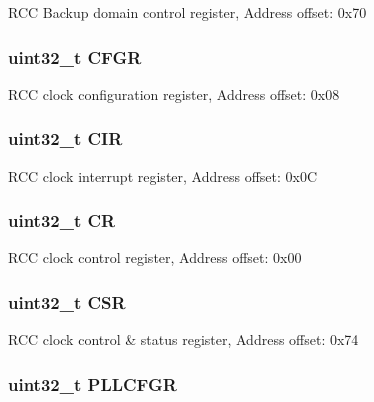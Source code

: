 R\-C\-C Backup domain control register, Address offset\-: 0x70 \hypertarget{struct_r_c_c___type_def_a26f1e746ccbf9c9f67e7c60e61085ec1}{
\subsubsection[{C\-F\-G\-R}]{ uint32\-\_\-t C\-F\-G\-R}}\label{struct_r_c_c___type_def_a26f1e746ccbf9c9f67e7c60e61085ec1}
R\-C\-C clock configuration register, Address offset\-: 0x08 \hypertarget{struct_r_c_c___type_def_a907d8154c80b7e385478943f90b17a3b}{
\subsubsection[{C\-I\-R}]{ uint32\-\_\-t C\-I\-R}}\label{struct_r_c_c___type_def_a907d8154c80b7e385478943f90b17a3b}
R\-C\-C clock interrupt register, Address offset\-: 0x0\-C \hypertarget{struct_r_c_c___type_def_ab40c89c59391aaa9d9a8ec011dd0907a}{
\subsubsection[{C\-R}]{ uint32\-\_\-t C\-R}}\label{struct_r_c_c___type_def_ab40c89c59391aaa9d9a8ec011dd0907a}
R\-C\-C clock control register, Address offset\-: 0x00 \hypertarget{struct_r_c_c___type_def_a876dd0a8546697065f406b7543e27af2}{
\subsubsection[{C\-S\-R}]{ uint32\-\_\-t C\-S\-R}}\label{struct_r_c_c___type_def_a876dd0a8546697065f406b7543e27af2}
R\-C\-C clock control \& status register, Address offset\-: 0x74 \hypertarget{struct_r_c_c___type_def_ae6ff257862eba6b4b367feea786bf1fd}{
\subsubsection[{P\-L\-L\-C\-F\-G\-R}]{ uint32\-\_\-t P\-L\-L\-C\-F\-G\-R}}\label{struct_r_c_c___type_def_ae6ff257862eba6b4b367feea786bf1fd}
